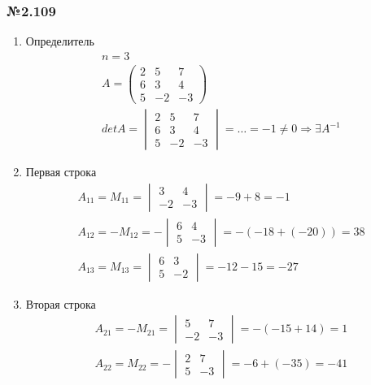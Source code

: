 \documentclass{article}
\begin{document}
\subsubsection*{№2.109}

\begin{enumerate}
	\item Определитель
	\begin{gather*}
		n = 3 \\
		A = \begin{pmatrix}
			2 & 5 & 7 \\
			6 & 3 & 4 \\
			5 & -2 & -3
		\end{pmatrix} \\
		det A = \begin{vmatrix}
			2 & 5 & 7 \\
			6 & 3 & 4 \\
			5 & -2 & -3
		\end{vmatrix} = \dots = -1 \ne 0 \Rightarrow \exists A^{-1}
	\end{gather*}
	\item Первая строка
	\begin{gather*}
		A_{11} = M_{11} = \begin{vmatrix}
			3 & 4 \\
			-2 & -3
		\end{vmatrix} = -9 + 8 = -1 \\
		A_{12} = -M_{12} = -\begin{vmatrix}
			6 & 4 \\
			5 & -3
		\end{vmatrix} = -(-18 + (-20)) = 38 \\
		A_{13} = M_{13} = \begin{vmatrix}
			6 & 3 \\
			5 & -2
		\end{vmatrix} = -12 - 15 = -27
	\end{gather*}
	\item Вторая строка
	\begin{gather*}
		A_{21} = -M_{21} = \begin{vmatrix}
			5 & 7 \\
			-2 & -3
		\end{vmatrix} = -(-15 + 14) = 1 \\
		A_{22} = M_{22} = -\begin{vmatrix}
			2 & 7 \\
			5 & -3
		\end{vmatrix} = -6 + (-35) = -41 \\

\end{gather*}
\end{enumerate}
\end{document}
